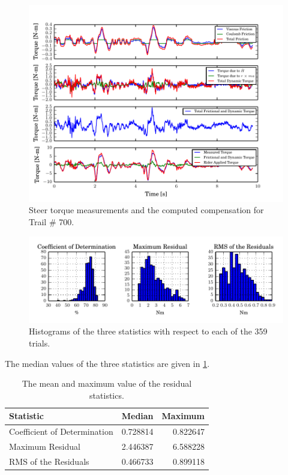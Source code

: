 \documentclass[a4paper]{article}
\begin{document}
\begin{figure}
  \includegraphics{figures/steer-torque-components.pdf}
  \caption{Steer torque measurements and the computed compensation for Trail \#
    700.}
  \label{fig:steer-torque-components}
\end{figure}

\begin{figure}
  \label{fig:residual-stats}
  \centering
  \caption{Histograms of the three statistics with respect to each of the 359
    trials.}
  \includegraphics{figures/residual-stats.pdf}
\end{figure}

The median values of the three statistics are given in \ref{tab:medians}.

\begin{table}
  \caption{The mean and maximum value of the residual statistics.}
  \centering
  \begin{tabular}{lrr}
    \hline
    Statistic                    & Median   & Maximum \\
    \hline
    Coefficient of Determination & 0.728814 & 0.822647 \\
    Maximum Residual             & 2.446387 & 6.588228 \\
    RMS of the Residuals         & 0.466733 & 0.899118
  \end{tabular}
  \label{tab:medians}
\end{table}
\end{document}
